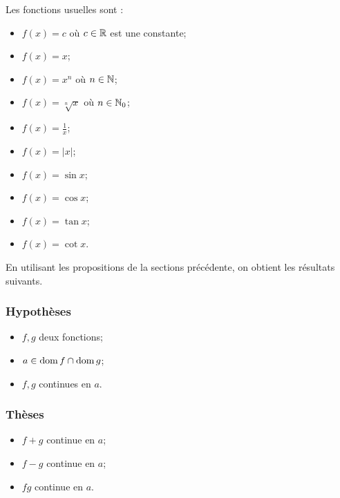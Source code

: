 \documentclass[main.tex]{subfiles}
\begin{document}
\begin{howto}
    
    Les fonctions usuelles sont :
    \begin{itemize}
     \item $f(x) = c$ où $c \in \mathbb{R}$ est une constante;
     \item $f(x) = x$;
     \item $f(x) = x^n$ où $n \in \mathbb{N}$;
     \item $f(x) = \sqrt[n]{x}$ où $n \in \mathbb{N}_0$;
     \item $f(x) = \frac{1}{x}$;
     \item $f(x) = |x|$;
     \item $f(x) = \sin x$;
     \item $f(x) = \cos x$;
     \item $f(x) = \tan x$;
     \item $f(x) = \cot x$.
    \end{itemize}
\end{howto}

En utilisant les propositions de la sections précédente, on obtient les résultats suivants.

\begin{proposition}

    \subsubsection{Hypothèses}
    \begin{itemize}
        \item $f, g$ deux fonctions;
        \item $a \in \operatorname{dom} f \cap \operatorname{dom} g$;
        \item $f ,g$ continues en $a$.
    \end{itemize}

    \subsubsection{Thèses}
    \begin{itemize}
        \item $f+g$ continue en $a$;
        \item $f-g$ continue en $a$;
        \item $fg$ continue en $a$.
    \end{itemize}
\end{proposition}
\end{document}

